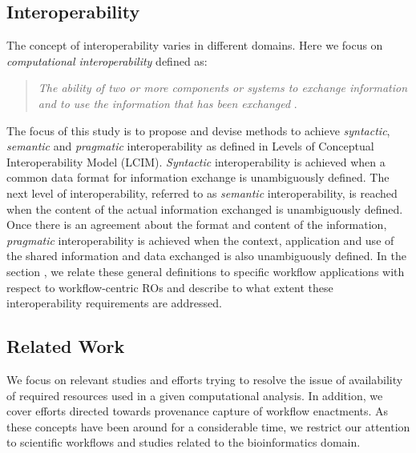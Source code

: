\documentclass[a4paper,num-refs]{oup-contemporary}
\begin{document}
 \subsection{Interoperability} \label{sec:interoperability}
 The concept of interoperability varies in different domains. Here we focus on \textit{computational interoperability} defined as:
 \begin{quote}
 \centering 
 \textit{The ability of two or more components or systems to exchange information and to use the information that has been exchanged} \citep{interope55:online}.
 \end{quote}
The focus of this study is to propose and devise methods to achieve \textit{syntactic}, \textit{semantic} and \textit{pragmatic} interoperability as defined in Levels of Conceptual Interoperability Model (LCIM)\citep{Tolk}. \textit{Syntactic} interoperability is achieved when a common data format for information exchange is unambiguously defined. The next level of interoperability, referred to as \textit{semantic} interoperability, is reached when the content of the actual information exchanged is unambiguously defined. Once there is an agreement about the format and content of the information, \textit{pragmatic} interoperability is achieved when the context, application and use of the shared information and data exchanged is also unambiguously defined. In the section \textbf{}, we relate these general definitions to specific workflow applications with respect to workflow-centric ROs and describe to what extent these interoperability requirements are addressed. 

\subsection{Related Work} \label{sec:relwork}
We focus on relevant studies and efforts trying to resolve the issue of availability of required resources used in a given computational analysis. In addition, we cover efforts directed towards provenance capture of workflow enactments. As these concepts have been around for a considerable time, we restrict our attention to scientific workflows and studies related to the bioinformatics domain.
\end{document}
